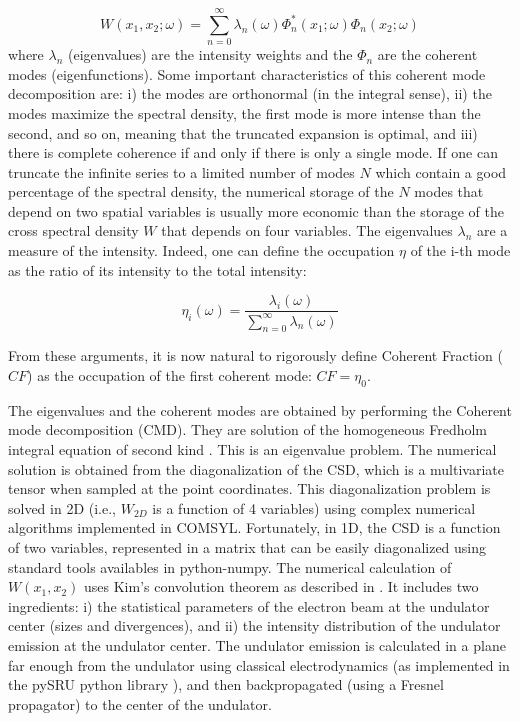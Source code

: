 \documentclass{iucr}              %
\begin{document}
\begin{equation}
W(x_1,x_2;\omega) = \sum_{n=0}^{\infty} \lambda_n(\omega) \Phi_n^*(x_1;\omega) \Phi_n(x_2;\omega) 
\label{eq:CMD}
\end{equation}
where $\lambda_n$ (eigenvalues) are the intensity weights and the $\Phi_n$ are the coherent modes (eigenfunctions). 
Some important characteristics of this coherent mode decomposition are: i) the modes are orthonormal (in the integral sense), ii) the modes maximize the spectral density, the first mode is more intense than the second, and so on, meaning that the truncated expansion is optimal, and iii) there is complete coherence if and only if there is only a single mode. If one can truncate the infinite series to a limited number of modes $N$ which contain a good percentage of the spectral density, the numerical storage of the $N$ modes that depend on two spatial variables is usually more economic than the storage of the cross spectral density $W$ that depends on four variables. 
The eigenvalues $\lambda_n$ are a measure of the intensity. Indeed, one can define the occupation $\eta$ of the i-th mode as the ratio of its intensity to the total intensity: 

\begin{equation}
\eta_i(\omega) = \frac{\lambda_i(\omega)}{\sum_{n=0}^{\infty} \lambda_n(\omega)}
\end{equation}

From these arguments, it is now natural to rigorously define Coherent Fraction ($CF$) as the occupation of the first coherent mode: $CF=\eta_0$.

The eigenvalues and the coherent modes are obtained by performing the Coherent mode decomposition (CMD). They are solution of the homogeneous Fredholm integral equation of second kind \cite{glass2017}. This is an eigenvalue problem. The numerical solution is obtained from the diagonalization of the CSD, which is a multivariate tensor when sampled at the point coordinates. This diagonalization problem is solved in 2D (i.e., $W_{2D}$ is a function of 4 variables) using complex numerical algorithms implemented in COMSYL. Fortunately, in 1D, the CSD is a function of two variables, represented in a matrix that can be easily diagonalized using standard tools availables in python-numpy. The numerical calculation of $W(x_1,x_2)$ uses Kim's convolution theorem \cite{kim1986b} as described in \cite{glass2017}. It includes two ingredients: i) the statistical parameters of the electron beam at the undulator center (sizes and divergences), and ii) the intensity distribution of the undulator emission at the undulator center. The undulator emission is calculated in a plane far enough from the undulator using classical electrodynamics \cite{jackson} (as implemented in the pySRU python library \cite{pySRU}), and then backpropagated (using a Fresnel propagator) to the center of the undulator. 
\end{document}
